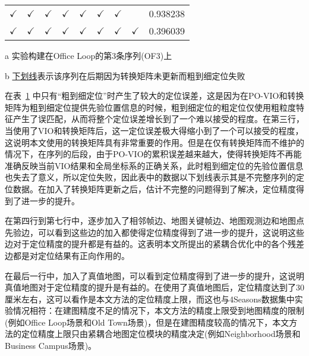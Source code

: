 \begin{table}
\begin{threeparttable}
\begin{tabular}{ccccccccc}
$\checkmark$ & $\checkmark$                                     &$\checkmark$                                                   & $\checkmark$                                    & $\checkmark$                                      & $\checkmark$                                     & $\checkmark$                                      &                                                 & 0.938238       \\
$\checkmark$ & $\checkmark$                                     &$\checkmark$                                                   & $\checkmark$                                    & $\checkmark$                                      & $\checkmark$                                     & $\checkmark$                                      & $\checkmark$                                    & 0.396039       \\ \bottomrule
\end{tabular}
\label{tab:loc_ablation}
\begin{tablenotes}
  \item [a] 实验构建在Office Loop的第3条序列(OF3)上
  \item [b] \underline{下划线}表示该序列在后期因为转换矩阵未更新而粗到细定位失败
\end{tablenotes}
\end{threeparttable}
\end{table}

在表~\ref{tab:loc_ablation} 中只有“粗到细定位”时产生了较大的定位误差，这是因为在PO-VIO和转换矩阵为粗到细定位提供先验位置信息的时候，粗到细定位的粗定位仅使用粗粒度特征产生了误匹配，从而将整个定位误差增长到了一个难以接受的程度。在第三行，当使用了VIO和转换矩阵后，这一定位误差极大得缩小到了一个可以接受的程度，这说明本文使用的转换矩阵具有非常重要的作用。但是在仅有转换矩阵而不维护的情况下，在序列的后段，由于PO-VIO的累积误差越来越大，使得转换矩阵不再能准确反映当前VIO结果和全局坐标系的正确关系，此时粗到细定位的先验位置信息也失去了意义，所以定位失败，因此表中的数据以下划线表示其是不完整序列的定位数据。在加入了转换矩阵更新之后，估计不完整的问题得到了解决，定位精度得到了进一步的提升。

在第四行到第七行中，逐步加入了相邻帧边、地图关键帧边、地图观测边和地图点先验边，可以看到这些边的加入都使得定位精度得到了进一步的提升，这说明这些边对于定位精度的提升都是有益的。这表明本文所提出的紧耦合优化中的各个残差边都是对定位结果有正向作用的。

在最后一行中，加入了真值地图，可以看到定位精度得到了进一步的提升，这说明真值地图对于定位精度的提升是有益的。在使用了真值地图后，定位精度达到了30厘米左右，这可以看作是本文方法的定位精度上限，而这也与4Seasons数据集中实验情况相符：在建图精度不足的情况下，本文方法的精度上限受到地图精度的限制(例如Office Loop场景和Old Town场景)，但是在建图精度较高的情况下，本文方法的定位精度上限只由紧耦合地图定位模块的精度决定(例如Neighborhood场景和Business Campus场景)。

